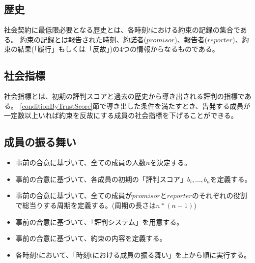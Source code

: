 \subsection{歴史}
社会契約に最低限必要となる歴史とは、各時刻$t$における約束の記録の集合である。
約束の記録とは報告された時刻、約諾者($promisor$)、報告者($reporter$)、約束の結果(「履行」もしくは「反故」)の4つの情報からなるものである。

\subsection{社会指標}
社会指標とは、初期の評判スコアと過去の歴史から導き出される評判の指標である。
\ref{conditionByTrustScore}節で導き出した条件を満たすとき、告発する成員が一定数以上いれば約束を反故にする成員の社会指標を下げることができる。

\subsection{成員の振る舞い}
  \begin{itemize}
    \item 事前の合意に基づいて、全ての成員の人数$n$を決定する。
    \item 事前の合意に基づいて、各成員の初期の「評判スコア」$b_i, ..., b_n$を定義する。
    \item 事前の合意に基づいて、全ての成員が$promisor$と$reporter$のそれぞれの役割で総当りする周期を定義する。(周期の長さは$ n * (n-1)$)
    \item 事前の合意に基づいて、「評判システム」を用意する。
    \item 事前の合意に基づいて、約束の内容を定義する。
    \item 各時刻$t$において、「時刻tにおける成員の振る舞い」を上から順に実行する。
  \end{itemize}

